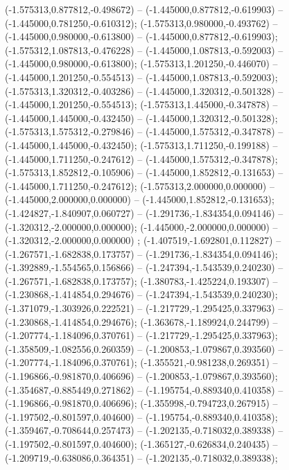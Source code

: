  (-1.575313,0.877812,-0.498672) -- (-1.445000,0.877812,-0.619903) -- (-1.445000,0.781250,-0.610312);
 (-1.575313,0.980000,-0.493762) -- (-1.445000,0.980000,-0.613800) -- (-1.445000,0.877812,-0.619903);
 (-1.575312,1.087813,-0.476228) -- (-1.445000,1.087813,-0.592003) -- (-1.445000,0.980000,-0.613800);
 (-1.575313,1.201250,-0.446070) -- (-1.445000,1.201250,-0.554513) -- (-1.445000,1.087813,-0.592003);
 (-1.575313,1.320312,-0.403286) -- (-1.445000,1.320312,-0.501328) -- (-1.445000,1.201250,-0.554513);
 (-1.575313,1.445000,-0.347878) -- (-1.445000,1.445000,-0.432450) -- (-1.445000,1.320312,-0.501328);
 (-1.575313,1.575312,-0.279846) -- (-1.445000,1.575312,-0.347878) -- (-1.445000,1.445000,-0.432450);
 (-1.575313,1.711250,-0.199188) -- (-1.445000,1.711250,-0.247612) -- (-1.445000,1.575312,-0.347878);
 (-1.575313,1.852812,-0.105906) -- (-1.445000,1.852812,-0.131653) -- (-1.445000,1.711250,-0.247612);
 (-1.575313,2.000000,0.000000) -- (-1.445000,2.000000,0.000000) -- (-1.445000,1.852812,-0.131653);
 (-1.424827,-1.840907,0.060727) -- (-1.291736,-1.834354,0.094146) -- (-1.320312,-2.000000,0.000000);
 (-1.445000,-2.000000,0.000000) -- (-1.320312,-2.000000,0.000000) ;
 (-1.407519,-1.692801,0.112827) -- (-1.267571,-1.682838,0.173757) -- (-1.291736,-1.834354,0.094146);
 (-1.392889,-1.554565,0.156866) -- (-1.247394,-1.543539,0.240230) -- (-1.267571,-1.682838,0.173757);
 (-1.380783,-1.425224,0.193307) -- (-1.230868,-1.414854,0.294676) -- (-1.247394,-1.543539,0.240230);
 (-1.371079,-1.303926,0.222521) -- (-1.217729,-1.295425,0.337963) -- (-1.230868,-1.414854,0.294676);
 (-1.363678,-1.189924,0.244799) -- (-1.207774,-1.184096,0.370761) -- (-1.217729,-1.295425,0.337963);
 (-1.358509,-1.082556,0.260359) -- (-1.200853,-1.079867,0.393560) -- (-1.207774,-1.184096,0.370761);
 (-1.355521,-0.981238,0.269351) -- (-1.196866,-0.981870,0.406696) -- (-1.200853,-1.079867,0.393560);
 (-1.354687,-0.885449,0.271862) -- (-1.195754,-0.889340,0.410358) -- (-1.196866,-0.981870,0.406696);
 (-1.355998,-0.794723,0.267915) -- (-1.197502,-0.801597,0.404600) -- (-1.195754,-0.889340,0.410358);
 (-1.359467,-0.708644,0.257473) -- (-1.202135,-0.718032,0.389338) -- (-1.197502,-0.801597,0.404600);
 (-1.365127,-0.626834,0.240435) -- (-1.209719,-0.638086,0.364351) -- (-1.202135,-0.718032,0.389338);
